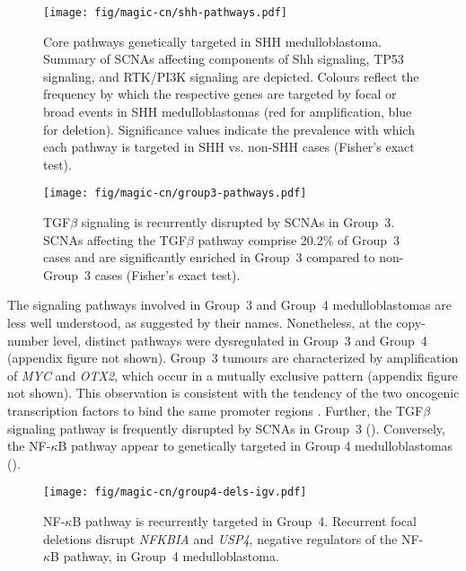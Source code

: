 \begin{SCfigure}[5]
	\centering
	\texttt{[image: fig/magic-cn/shh-pathways.pdf]}
	\caption[Core pathways genetically targeted in SHH medulloblastoma]
	{
	Core pathways genetically targeted in SHH medulloblastoma.
	Summary of SCNAs affecting components of Shh signaling, TP53 signaling, and RTK/PI3K signaling are depicted. Colours reflect the frequency by which the respective genes are targeted by focal or broad events in SHH medulloblastomas (red for amplification, blue for deletion). Significance values indicate the prevalence with which each pathway is targeted in SHH vs. non-SHH cases (Fisher's exact test).
	}
	\label{fig:shh-pathways}
\end{SCfigure}

\begin{SCfigure}[5][b]
	\centering
	\texttt{[image: fig/magic-cn/group3-pathways.pdf]}
	\caption[TGF$\beta$ signaling is recurrently disrupted by SCNAs in Group~3]
	{
	TGF$\beta$ signaling is recurrently disrupted by SCNAs in Group~3.
	SCNAs affecting the TGF$\beta$ pathway comprise 20.2\% of Group~3 cases and are significantly enriched in Group~3 compared to non-Group~3 cases (Fisher's exact test).
	}
	\label{fig:group3-pathways}
\end{SCfigure}

\clearpage

The signaling pathways involved in Group~3 and Group~4 medulloblastomas are less well understood, as suggested by their names. Nonetheless, at the copy-number level, distinct pathways were dysregulated in Group~3 and Group~4 (appendix figure not shown). Group~3 tumours are characterized by amplification of \emph{MYC} and \emph{OTX2}, which occur in a mutually exclusive pattern (appendix figure not shown). This observation is consistent with the tendency of the two oncogenic transcription factors to bind the same promoter regions . Further, the TGF$\beta$ signaling pathway is frequently disrupted by SCNAs in Group~3 (). Conversely, the NF-$\kappa$B pathway appear to genetically targeted in Group 4 medulloblastomas ().

\begin{SCfigure}[2]
	\centering
	\texttt{[image: fig/magic-cn/group4-dels-igv.pdf]}
	\caption[NF-$\kappa$B pathway is recurrently targeted in Group~4]
	{
	NF-$\kappa$B pathway is recurrently targeted in Group~4.
	Recurrent focal deletions disrupt \emph{NFKBIA} and \emph{USP4}, negative regulators of the NF-$\kappa$B pathway, in Group~4 medulloblastoma.
	}
	\label{fig:group4-dels-igv}
\end{SCfigure}

